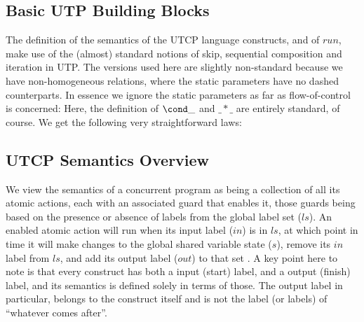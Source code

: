 \subsection{Basic UTP Building Blocks}

The definition of the semantics of the UTCP language
constructs, and of $run$,
make use of the (almost) standard notions of skip,
sequential composition
and iteration in UTP.
The versions used here are slightly non-standard because we have
non-homogeneous relations,
where the static parameters have no dashed counterparts.
In essence we ignore the static parameters as far as flow-of-control is concerned:
Here, the definition of $\cond\_$ and $\_ * \_$ are entirely standard, of course.
We get the following very straightforward laws:

\subsection{UTCP Semantics Overview}

We view the semantics of a concurrent program as being a collection
of all its atomic actions, each with an associated guard that enables
it, those guards being based on the presence or absence of labels
from the global label set ($ls$).
An enabled atomic action will run when its input label ($in$) is in $ls$,
at which point in time
it will make changes to the global shared variable state ($s$),
remove its $in$ label from $ls$,
and add its output label ($out$) to that set%
.
A key point here to note is that every construct has both a input (start) label,
and a output (finish) label,
and its semantics is defined solely in terms of those.
The output label in particular,
belongs to the construct itself
and is not the label (or labels) of ``whatever comes after''.


